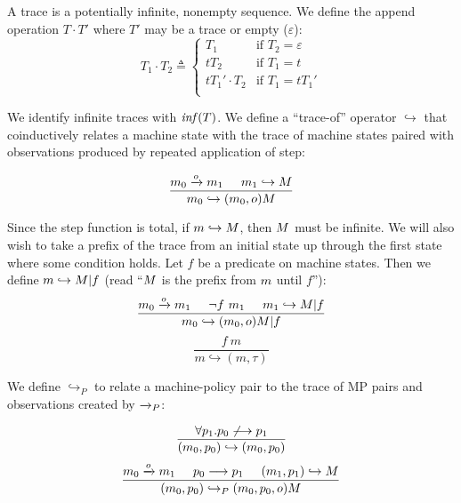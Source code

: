 \documentclass[conference]{IEEEtran}
\begin{document}
    A trace is a potentially infinite, nonempty sequence. We define the append operation \(T \cdot T'\)
    where \(T'\) may be a trace or empty (\(\varepsilon\)):
    \[T_1 \cdot T_2 \triangleq
      \begin{cases}
        T_1 & \text{if } T_2 = \varepsilon \\
        t T_2 & \text{if } T_1 = t \\
        t T_1' \cdot T_2 & \text{if } T_1 = t T_1' \\
      \end{cases}\]

    We identify infinite traces with \(\mathit{inf}(T)\). We define a ``trace-of'' operator \(\hookrightarrow\)
    that coinductively relates a machine state with the trace of machine states paired with observations
    produced by repeated application of step:

    \[\frac{m_0 \xrightarrow{o} m_1 \hspace{.5cm} m_1 \hookrightarrow M}
           {m_0 \hookrightarrow (m_0,o) M}\]

    Since the step function is total, if \(m \hookrightarrow M\), then \(M\) must be infinite.
    We will also wish to take a prefix of the trace from an initial state up through 
    the first state where some condition holds. Let \(f\) be a predicate on machine states.
    Then we define \(m \hookrightarrow M | f\) (read ``\(M\) is the prefix from
    \(m\) until \(f\)''):
    \[\frac{m_0 \xrightarrow{o} m_1 \hspace{.5cm} \neg f\ m_1 \hspace{.5cm} m_1
              \hookrightarrow M | f}
           {m_0 \hookrightarrow (m_0,o) M | f}\]
    \[\frac{f\ m}
           {m \hookrightarrow (m,\tau)}\]

    We define \(\hookrightarrow_P\) to relate a machine-policy pair to the trace of MP pairs and observations
    created by \(\xrightarrow{}_P\):

    \[\frac{\forall p_1 . p_0 \not \longrightarrow p_1}
           {(m_0,p_0) \hookrightarrow (m_0,p_0)}\]
    \[\frac{m_0 \xrightarrow{o} m_1 \hspace{.5cm} p_0 \longrightarrow p_1 \hspace{.5cm}
              (m_1,p_1) \hookrightarrow M}
           {(m_0,p_0) \hookrightarrow_P (m_0,p_0,o) M}\]
    
\end{document}
